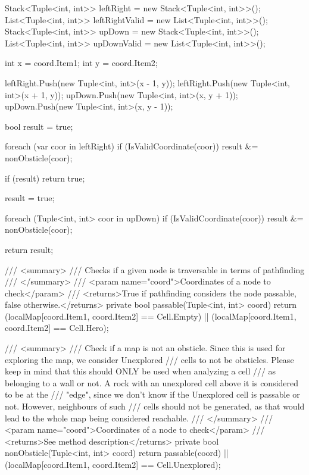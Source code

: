 \documentclass[11pt]{article}
\begin{document}
\begin{code}
{{{            Stack<Tuple<int, int>> leftRight = new Stack<Tuple<int, int>>();
            List<Tuple<int, int>> leftRightValid = new List<Tuple<int, int>>();
            Stack<Tuple<int, int>> upDown = new Stack<Tuple<int, int>>();
            List<Tuple<int, int>> upDownValid = new List<Tuple<int, int>>();

            int x = coord.Item1;
            int y = coord.Item2;

            leftRight.Push(new Tuple<int, int>(x - 1, y));
            leftRight.Push(new Tuple<int, int>(x + 1, y));
            upDown.Push(new Tuple<int, int>(x, y + 1));
            upDown.Push(new Tuple<int, int>(x, y - 1));

            bool result = true;

            foreach (var coor in leftRight)
            {
                if (IsValidCoordinate(coor))
                {
                    result &= nonObsticle(coor);
                }
            }

            if (result)
            {
                return true;
            }

            result = true;

            foreach (Tuple<int, int> coor in upDown)
            {
                if (IsValidCoordinate(coor))
                {
                    result &= nonObsticle(coor);
                }
            }

            return result;
        }

        /// <summary>
        /// Checks if a given node is traversable in terms of pathfinding
        /// </summary>
        /// <param name="coord">Coordinates of a node to check</param>
        /// <returns>True if pathfinding considers the node passable, false otherwise.</returns>
        private bool passable(Tuple<int, int> coord)
        {
            return (localMap[coord.Item1, coord.Item2] == Cell.Empty)
                || (localMap[coord.Item1, coord.Item2] == Cell.Hero);
        }

        /// <summary>
        /// Check if a map is not an obsticle. Since this is used for exploring the map, we consider Unexplored
        /// cells to not be obsticles. Please keep in mind that this should ONLY be used when analyzing a cell
        /// as belonging to a wall or not. A rock with an unexplored cell above it is considered to be at the
        /// "edge", since we don't know if the Unexplored cell is passable or not. However, neighbours of such
        /// cells should not be generated, as that would lead to the whole map being considered reachable.
        /// </summary>
        /// <param name="coord">Coordinates of a node to check</param>
        /// <returns>See method description</returns>
        private bool nonObsticle(Tuple<int, int> coord)
        {
            return passable(coord) || (localMap[coord.Item1, coord.Item2] == Cell.Unexplored);
        }

}}
\end{code}
\end{document}
